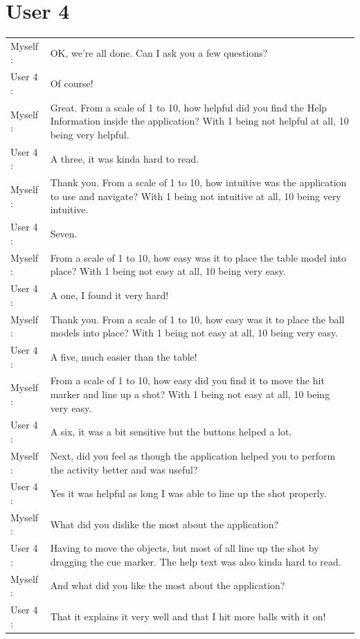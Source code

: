 \documentclass[ %
                author={Finn Alexander Wilkinson},
                supervisor={Dr. Andrew Calway},
                degree={MEng},
                title={\centering A Mixed Reality Aim Assistant for Pool and Snooker},
                subtitle={},
                type={Enterprise},
                year={2021} ]{dissertation}
\begin{document}
\section{User 4}
\begin{tabular}{l p{130mm}}
    Myself : & OK, we're all done. Can I ask you a few questions? \\
    User 4 : & Of course!\\
    Myself : & Great. From a scale of 1 to 10, how helpful did you find the Help Information inside the application? With 1 being not helpful at all, 10 being very helpful. \\
    User 4 : & A three, it was kinda hard to read.\\
    Myself : & Thank you. From a scale of 1 to 10, how intuitive was the application to use and navigate? With 1 being not intuitive at all, 10 being very intuitive.\\
    User 4 : & Seven.\\
    Myself : & From a scale of 1 to 10, how easy was it to place the table model into place? With 1 being not easy at all, 10 being very easy.\\
    User 4 : & A one, I found it very hard!\\
    Myself : & Thank you. From a scale of 1 to 10, how easy was it to place the ball models into place? With 1 being not easy at all, 10 being very easy.\\ 
    User 4 : & A five, much easier than the table!\\
    Myself : & From a scale of 1 to 10, how easy did you find it to move the hit marker and line up a shot? With 1 being not easy at all, 10 being very easy. \\
    User 4 : & A six, it was a bit sensitive but the buttons helped a lot.\\
    Myself : & Next, did you feel as though the application helped you to perform the activity better and was useful? \\
    User 4 : & Yes it was helpful as long I was able to line up the shot properly.\\
    Myself : & What did you dislike the most about the application? \\
    User 4 : & Having to move the objects, but most of all line up the shot by dragging the cue marker. The help text was also kinda hard to read.\\
    Myself : & And what did you like the most about the application? \\
    User 4 : & That it explains it very well and that I hit more balls with it on!\\

\end{tabular}
\end{document}
